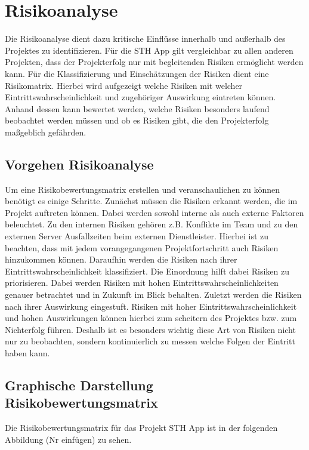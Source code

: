 \chapter{Risikoanalyse}

Die Risikoanalyse dient dazu kritische Einflüsse innerhalb und außerhalb des Projektes zu identifizieren. Für die STH App gilt vergleichbar zu allen anderen Projekten, dass der Projekterfolg nur mit begleitenden Risiken ermöglicht werden kann. Für die Klassifizierung und Einschätzungen der Risiken dient eine Risikomatrix. Hierbei wird aufgezeigt welche Risiken mit welcher Eintrittswahrscheinlichkeit und zugehöriger Auswirkung eintreten können. Anhand dessen kann bewertet werden, welche Risiken besonders laufend beobachtet werden müssen und ob es Risiken gibt, die den Projekterfolg maßgeblich gefährden.

\section{Vorgehen Risikoanalyse}
Um eine Risikobewertungsmatrix erstellen und veranschaulichen zu können benötigt es einige Schritte. Zunächst müssen die Risiken erkannt werden, die im Projekt auftreten können. Dabei werden sowohl interne als auch externe Faktoren beleuchtet. Zu den internen Risiken gehören z.B. Konflikte im Team und zu den externen Server Ausfallzeiten beim externen Dienstleister. Hierbei ist zu beachten, dass mit jedem vorangegangenen Projektfortschritt auch Risiken hinzukommen können. Daraufhin werden die Risiken nach ihrer Eintrittswahrscheinlichkeit klassifiziert. Die Einordnung hilft dabei Risiken zu priorisieren. Dabei werden Risiken mit hohen Eintrittswahrscheinlichkeiten genauer betrachtet und in Zukunft im Blick behalten. Zuletzt werden die Risiken nach ihrer Auswirkung eingestuft. Risiken mit hoher Eintrittswahrscheinlichkeit und hohen Auswirkungen können hierbei zum scheitern des Projektes bzw. zum Nichterfolg führen. Deshalb ist es besonders wichtig diese Art von Risiken nicht nur zu beobachten, sondern kontinuierlich zu messen welche Folgen der Eintritt haben kann.


\section{Graphische Darstellung Risikobewertungsmatrix}
Die Risikobewertungsmatrix für das Projekt STH App ist in der folgenden Abbildung (Nr einfügen) zu sehen.

